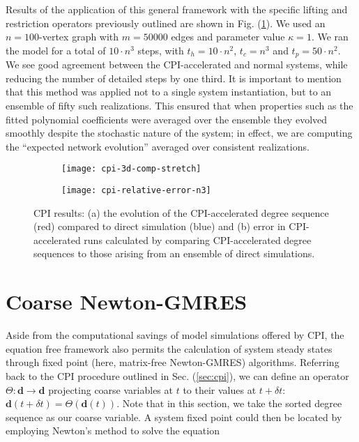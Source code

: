   Results of the application of this general framework with the
  specific lifting and restriction operators previously outlined are
  shown in Fig. (\ref{fig:cpi-results}). We used an $n=100$-vertex
  graph with $m=50000$ edges and parameter value $\kappa=1$. We ran
  the model for a total of $10 \cdot n^3$ steps, with
  $t_h = 10 \cdot n^2$, $t_c = n^3$ and $t_p = 50 \cdot n^2$.
  We see good agreement between the CPI-accelerated and normal
  systems, while reducing the number of detailed steps by one third.
  It is important to mention that this method was applied not to a
  single system instantiation, but to an ensemble of fifty such
  realizations.  This ensured that when properties such as the fitted
  polynomial coefficients were averaged over the ensemble they evolved
  smoothly despite the stochastic nature of the system; in effect, we
  are computing the ``expected network evolution'' averaged over
  consistent realizations.

  \begin{figure}
    \vspace{-5mm} \centering
    \begin{subfigure}{0.59\textwidth}
      \centering
      \texttt{[image: cpi-3d-comp-stretch]}
      \subcaption{\label{fig:cpi-error}}
    \end{subfigure} %
    \begin{subfigure}{0.39\textwidth}
      \centering
      \texttt{[image: cpi-relative-error-n3]}
      \subcaption{\label{fig:self-error}}
    \end{subfigure}%
    \caption[Coarse-projective integration results]{CPI results: (a)
      the evolution of the CPI-accelerated degree sequence (red)
      compared to direct simulation (blue) and (b) error in
      CPI-accelerated runs calculated by comparing CPI-accelerated
      degree sequences to those arising from an ensemble of direct
      simulations. \label{fig:cpi-results}}
  \end{figure}


  \section{Coarse Newton-GMRES}
  \label{sec:ng}
  Aside from the computational savings of model simulations offered by
  CPI, the equation free framework also permits the calculation of
  system steady states through fixed point (here, matrix-free
  Newton-GMRES) algorithms.
  Referring back to the CPI procedure outlined in
  Sec. (\ref{sec:cpi}), we can define an operator
  $\Theta: \mathbf{d} \rightarrow \mathbf{d}$ projecting coarse
  variables at $t$ to their values at $t + \delta t$:
  $\mathbf{d}(t+\delta t) =\Theta(\mathbf{d}(t))$.
  Note that in this section, we take the sorted degree sequence as our
  coarse variable.
  A system fixed point could then be located by employing Newton's
  method to solve the equation

